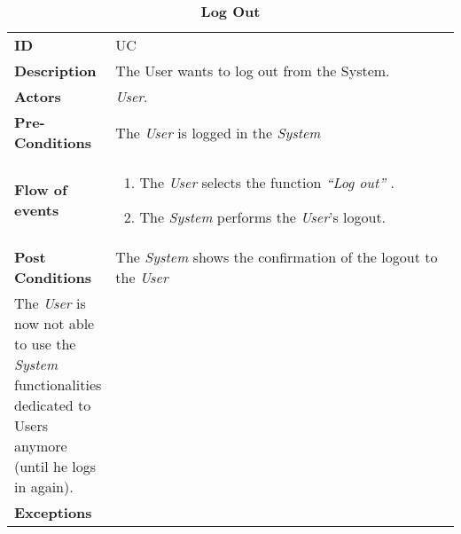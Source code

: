 \begin{longtable}{|p{0.2\linewidth} p{0.8\linewidth}|}
	\captionsetup{labelformat=empty} %
	\caption{\textbf{Log Out}} %
	\label{UC_Logout}%
	\\ \hline %
	
	\textbf{ID} & UC\theUseCaseIdCounter \\ \hline
	\textbf{Description} & The User wants to log out from the System. \\ \hline
	\textbf{Actors} & \emph{User}.\\ \hline
	\textbf{Pre-Conditions} & The \emph{User} is logged in the \emph{System} \\ \hline
	\textbf{Flow of events} & 
	\begin{enumerate}
		\item The \emph{User} selects the function \textit{\textquotedblleft{Log out}\textquotedblright} .
		\item The \emph{System} performs the \emph{User}'s logout.
	\end{enumerate}	 \\ \hline
	\textbf{Post Conditions} & The \emph{System} shows the confirmation of the logout to the \emph{User}\\ \hline
	The \emph{User} is now not able to use the \emph{System} functionalities dedicated to Users anymore (until he logs in again). \\ \hline
	\textbf{Exceptions} & 
\end{longtable}

